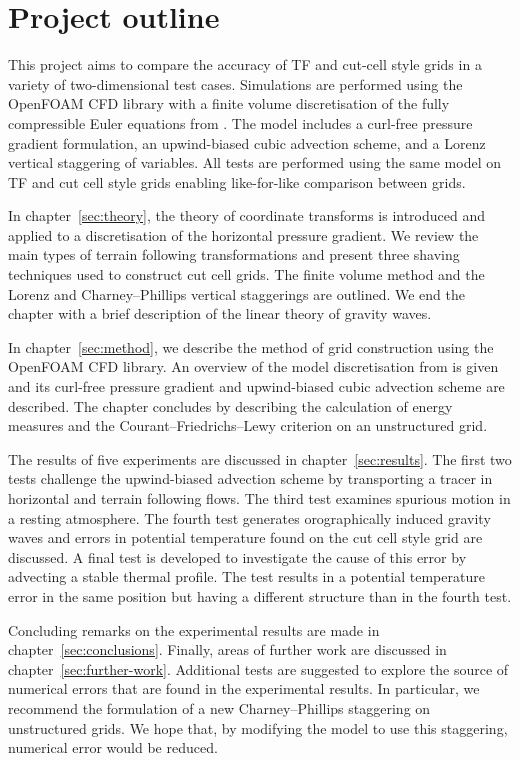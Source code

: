 \section{Project outline}
This project aims to compare the accuracy of TF and cut-cell style grids in a variety of two-dimensional test cases.   Simulations are performed using the OpenFOAM CFD library \autocite{openfoam} with a finite volume discretisation of the fully compressible Euler equations from \textcite{weller-shahrokhi2014}.  The model includes a curl-free pressure gradient formulation, an upwind-biased cubic advection scheme, and a Lorenz vertical staggering of variables.  All tests are performed using the same model on TF and cut cell style grids enabling like-for-like comparison between grids.

In chapter~\ref{sec:theory}, the theory of coordinate transforms is introduced and applied to a discretisation of the horizontal pressure gradient.  We review the main types of terrain following transformations and present three shaving techniques used to construct cut cell grids.  The finite volume method and the Lorenz and Charney--Phillips vertical staggerings are outlined.  We end the chapter with a brief description of the linear theory of gravity waves.

In chapter~\ref{sec:method}, we describe the method of grid construction using the OpenFOAM CFD library.  An overview of the model discretisation from \textcite{weller-shahrokhi2014} is given and its curl-free pressure gradient and upwind-biased cubic advection scheme are described.  The chapter concludes by describing the calculation of energy measures and the Courant--Friedrichs--Lewy criterion on an unstructured grid.

The results of five experiments are discussed in chapter~\ref{sec:results}.  The first two tests challenge the upwind-biased advection scheme by transporting a tracer in horizontal and terrain following flows.  The third test examines spurious motion in a resting atmosphere.  The fourth test generates orographically induced gravity waves and errors in potential temperature found on the cut cell style grid are discussed.  A final test is developed to investigate the cause of this error by advecting a stable thermal profile.  The test results in a potential temperature error in the same position but having a different structure than in the fourth test.

Concluding remarks on the experimental results are made in chapter~\ref{sec:conclusions}.  Finally, areas of further work are discussed in chapter~\ref{sec:further-work}.  Additional tests are suggested to explore the source of numerical errors that are found in the experimental results.  In particular, we recommend the formulation of a new Charney--Phillips staggering on unstructured grids.  We hope that, by modifying the model to use this staggering, numerical error would be reduced.

